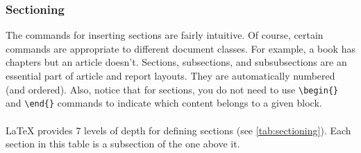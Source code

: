 \documentclass{article} %
\begin{document}
\subsubsection{Sectioning}
\label{subsubsection:sectionsandsubs}
The commands for inserting sections are fairly intuitive. Of course, certain commands are appropriate to different document classes. For example, a book has chapters but an article doesn't. Sections, subsections, and subsubsections are an essential part of article and report layouts. They are automatically numbered (and ordered). Also, notice that for sections, you do not need to use \verb+\begin{}+ and \verb+\end{}+ commands to indicate which content belongs to a given block.

\paragraph{}
LaTeX provides 7 levels of depth for defining sections (see \cref{tab:sectioning}). Each section in this table is a subsection of the one above it.
\end{document}
